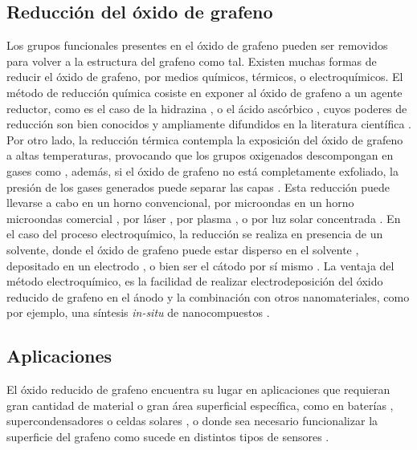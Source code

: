 \subsection{Reducción del óxido de grafeno}
Los grupos funcionales presentes en el óxido de grafeno pueden ser removidos para volver a la estructura del grafeno como tal.
Existen muchas formas de reducir el óxido de grafeno, por medios químicos, térmicos, o electroquímicos. El método de reducción química cosiste en exponer al óxido de grafeno a un agente reductor, como es el caso de la hidrazina , o el ácido ascórbico \citep{Fernandez-Merino2010}, cuyos poderes de reducción son bien conocidos y ampliamente difundidos en la literatura científica \citep{Chua2015}. Por otro lado, la reducción térmica contempla la exposición del óxido de grafeno a altas temperaturas, provocando que los grupos oxigenados descompongan en gases como , además, si el óxido de grafeno no está completamente exfoliado, la presión de los gases generados puede separar las capas \citep{Pei2012}. Esta reducción puede llevarse a cabo en un horno convencional, por microondas en un horno microondas comercial \citep{Zhu2010a}, por láser \citep{El-Kady2013}, por plasma \citep{Lee2012}, o por luz solar concentrada \citep{Mohandoss2017}. En el caso del proceso electroquímico, la reducción se realiza en presencia de un solvente, donde el óxido de grafeno puede estar disperso en el solvente \citep{Liu2011}, depositado en un electrodo \citep{Harima2011, Toh2014}, o bien ser el cátodo por sí mismo \citep{Feng2016}. La ventaja del método electroquímico, es la facilidad de realizar electrodeposición del óxido reducido de grafeno en el ánodo y la combinación con otros nanomateriales, como por ejemplo, una síntesis \emph{in-situ} de nanocompuestos \citep{Liu2011, Xie2014}.






\subsection{Aplicaciones}
El óxido reducido de grafeno encuentra su lugar en aplicaciones que requieran gran cantidad de material o gran área superficial específica, como en baterías \citep{Li2014}, supercondensadores \citep{Stoller2008} o celdas solares \citep{Roy-mayhew2014}, o donde sea necesario funcionalizar la superficie del grafeno como sucede en distintos tipos de sensores \citep{Schedin2007, Haick2013}.

